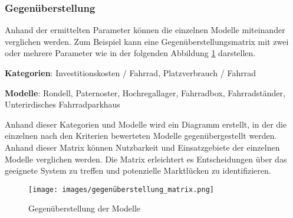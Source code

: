 \subsubsection{Gegenüberstellung}

Anhand der ermittelten Parameter können die einzelnen Modelle miteinander verglichen werden. Zum Beispiel kann eine Gegenüberstellungsmatrix mit zwei oder mehrere Parameter wie in der folgenden Abbildung \ref{fig:gegenueberstellung} darstellen.

\medskip

\textbf{Kategorien}: Investitionskosten / Fahrrad, Platzverbrauch / Fahrrad

\indent
\textbf{Modelle}: Rondell, Paternoster, Hochregallager, Fahrradbox, Fahrradständer, Unterirdisches Fahrradparkhaus

\medskip

\noindent Anhand dieser Kategorien und Modelle wird ein Diagramm erstellt, in der die einzelnen nach den Kriterien bewerteten Modelle gegenübergestellt werden. Anhand dieser Matrix können Nutzbarkeit und Einsatzgebiete der einzelnen Modelle verglichen werden. Die Matrix erleichtert es Entscheidungen über das geeignete System zu treffen und potenzielle Marktlücken zu identifizieren.

\begin{figure}[H]
  \centering
  \texttt{[image: images/gegenüberstellung\_matrix.png]}
  \caption{Gegenüberstellung der Modelle}
  \label{fig:gegenueberstellung}
\end{figure}